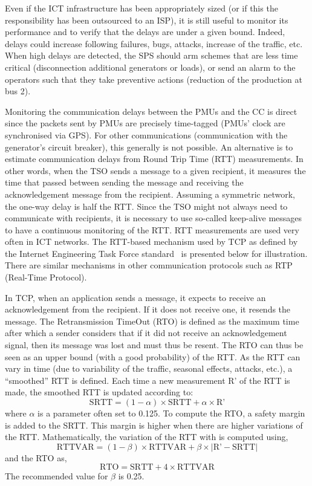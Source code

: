 Even if the ICT infrastructure has been appropriately sized (or if this the responsibility has been outsourced to an ISP), it is still useful to monitor its performance and to verify that the delays are under a given bound. Indeed, delays could increase following failures, bugs, attacks, increase of the traffic, etc. When high delays are detected, the SPS should arm schemes that are less time critical (\eg disconnection additional generators or loads), or send an alarm to the operators such that they take preventive actions (\eg reduction of the production at bus 2).

Monitoring the communication delays between the PMUs and the CC is direct since the packets sent by PMUs are precisely time-tagged (PMUs' clock are synchronised via GPS). For other communications (\eg communication with the generator's circuit breaker), this generally is not possible. An alternative is to estimate communication delays from Round Trip Time (RTT) measurements. In other words, when the TSO sends a message to a given recipient, it measures the time that passed between sending the message and receiving the acknowledgement message from the recipient. Assuming a symmetric network, the one-way delay is half the RTT. Since the TSO might not always need to communicate with recipients, it is necessary to use so-called keep-alive messages to have a continuous monitoring of the RTT. RTT measurements are used very often in ICT networks. The RTT-based mechanism used by TCP as defined by the Internet Engineering Task Force standard~\cite{roundTripTime} is presented below for illustration. There are similar mechanisms in other communication protocols such as RTP (Real-Time Protocol).

In TCP, when an application sends a message, it expects to receive an acknowledgement from the recipient. If it does not receive one, it resends the message. The Retransmission TimeOut (RTO) is defined as the maximum time after which a sender considers that if it did not receive an acknowledgement signal, then its message was lost and must thus be resent. The RTO can thus be seen as an upper bound (with a good probability) of the RTT. As the RTT can vary in time (due to variability of the traffic, seasonal effects, attacks, etc.), a ``smoothed'' RTT is defined. Each time a new measurement R' of the RTT is made, the smoothed RTT is updated according to:
%
\begin{equation}\text{SRTT} = (1-\alpha)\times\text{SRTT} + \alpha\times\text{R'}\end{equation}
%
where \(\alpha\) is a parameter often set to 0.125. To compute the RTO, a safety margin is added to the SRTT. This margin is higher when there are higher variations of the RTT. Mathematically, the variation of the RTT with is computed using,
%
\begin{equation}\text{RTTVAR} = (1-\beta)\times\text{RTTVAR} + \beta\times |\text{R'}-\text{SRTT}|\end{equation}
%
and the RTO as,
%
\begin{equation}\text{RTO} = \text{SRTT} + 4 \times \text{RTTVAR}\end{equation}
%
The recommended value for \(\beta\) is 0.25.


